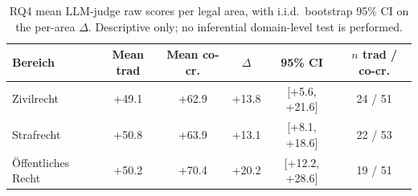 \begin{table}[t]
\centering\footnotesize
\caption{RQ4 mean LLM-judge raw scores per legal area, with i.i.d.\ bootstrap 95\% CI on the per-area $\Delta$. Descriptive only; no inferential domain-level test is performed.}
\label{tbl-rq4-by-bereich}
\setlength{\tabcolsep}{4pt}
\begin{tabular*}{\textwidth}{@{\extracolsep{\fill}}lccccc@{}}
\toprule
Bereich & Mean trad & Mean co-cr. & $\Delta$ & 95\% CI & $n$ trad / co-cr. \\
\midrule
Zivilrecht & +49.1 & +62.9 & +13.8 & [+5.6, +21.6] & 24 / 51 \\
Strafrecht & +50.8 & +63.9 & +13.1 & [+8.1, +18.6] & 22 / 53 \\
Öffentliches Recht & +50.2 & +70.4 & +20.2 & [+12.2, +28.6] & 19 / 51 \\
\bottomrule
\end{tabular*}
\end{table}

